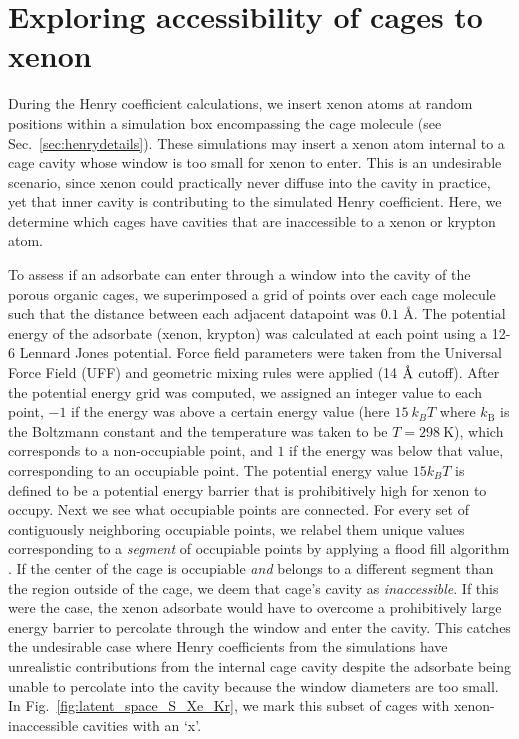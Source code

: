 \documentclass[journal=jacsat,manuscript=article]{achemso}
\newcommand{\angstrom}{\mbox{\normalfont\AA}}
\begin{document}
\clearpage

\section{\color{red}Exploring accessibility of cages to xenon}
\label{sec:inaccessibility}
{\color{red}
During the Henry coefficient calculations, we insert xenon atoms at random positions within a simulation box encompassing the cage molecule (see Sec.~\ref{sec:henrydetails}). These simulations may insert a xenon atom internal to a cage cavity whose window is too small for xenon to enter. This is an undesirable scenario, since xenon could practically never diffuse into the cavity in practice, yet that inner cavity is contributing to the simulated Henry coefficient. Here, we determine which cages have cavities that are inaccessible to a xenon or krypton atom.

To assess if an adsorbate can enter through a window into the cavity of the porous organic cages, we superimposed a grid of points over each cage molecule such that the distance between each adjacent datapoint was $0.1$ \AA. The potential energy of the adsorbate (xenon, krypton) was calculated at each point using a 12-6 Lennard Jones potential. Force field parameters were taken from the Universal Force Field (UFF) and geometric mixing rules were applied (14 $\angstrom$ cutoff). After the potential energy grid was computed, we assigned an integer value to each point, $-1$ if the energy was above a certain energy value (here $15 \ k_BT$ where $k_\text{B}$ is the Boltzmann constant and the temperature was taken to be $T = 298 \ \text{K}$), which corresponds to a non-occupiable point, and $1$ if the energy was below that value, corresponding to an occupiable point. The potential energy value $15k_B T$ is defined to be a potential energy barrier that is prohibitively high for xenon to occupy\cite{kim2012high}.
Next we see what occupiable points are connected. For every set of contiguously neighboring occupiable points, we relabel them unique values corresponding to a \emph{segment} of occupiable points by applying a flood fill algorithm \cite{martin2012accelerating,kim2012high}. If the center of the cage is occupiable \emph{and} belongs to a different segment than the region outside of the cage, we deem that cage's cavity as \emph{inaccessible}. If this were the case, the xenon adsorbate would have to overcome a prohibitively large energy barrier to percolate through the window and enter the cavity. This catches the undesirable case where Henry coefficients from the simulations have unrealistic contributions from the internal cage cavity despite the adsorbate being unable to percolate into the cavity because the window diameters are too small. In Fig.~\ref{fig:latent_space_S_Xe_Kr}, we mark this subset of cages with xenon-inaccessible cavities with an `x'.

}
\end{document}
